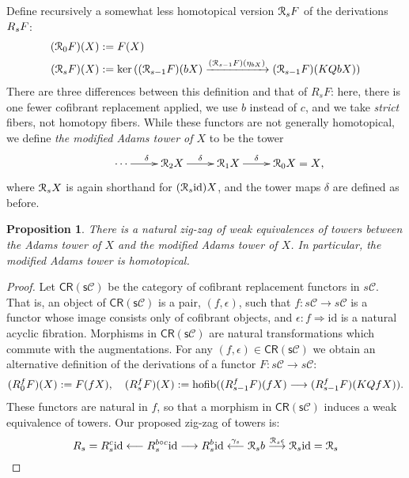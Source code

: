 \documentclass[11pt]{amsart} \renewcommand{\baselinestretch}{1.2}
\theoremstyle{plain}
\newtheorem{prop}[thm]{Proposition}
\theoremstyle{definition}
\renewcommand{\ker}{\mathrm{ker}\,}
\DeclareMathOperator*{\hofib}{hofib}
\renewcommand{\to}{\longrightarrow}
\newcommand{\from}{\longleftarrow}
\newcommand{\calR}{\mathcal{R}}
\newcommand{\calc}{\mathcal{C}}
\newcommand{\Id}{\mathrm{id}}
\newcommand{\algcat}{{\calc}}%
\newcommand{\dupdown}[2]{R_{\smash{#1}}}
\newcommand{\caldup}[1]{\calR_{\smash{#1}}}
\newcommand{\plainD}{R}
\newcommand{\barConstructionMightAbbreviate}{b}
\begin{document}
\begin{Bousfield-Kan spectral sequence}
Define recursively a somewhat less homotopical version $\caldup{s}F$ of the derivations $\dupdown{s}{}F$:
\begin{alignat*}{2}
(\caldup{0}F)(X)
&:=
F(X)%
\\
(\caldup{s}F)(X)
&:=
\ker((\caldup{s-1}F)(\barConstructionMightAbbreviate X)\xrightarrow{(\caldup{s-1}F)(\eta_{\barConstructionMightAbbreviate X})} (\caldup{s-1}F)(KQ\barConstructionMightAbbreviate X))
\end{alignat*}
There are three differences between this definition and that of $\plainD_sF$: here, there is one fewer cofibrant replacement applied, we use $\barConstructionMightAbbreviate $ instead of  $c$, and we take \emph{strict} fibers, not homotopy fibers.
While these functors are not generally homotopical, we define \emph{the modified Adams tower of $X$} to be the tower
\[\xymatrix@R=4mm{
\cdots 
\ar[r]^{\delta}
&%
\caldup{2}X
\ar[r]^{\delta}
&%
\caldup{1}X
\ar[r]^{\delta}&%
\caldup{0}X\makebox[0cm][l]{${}=X$,}
}\]
where $\caldup{s}X$ is again shorthand for $(\caldup{s}\Id )X$, and the tower maps $\delta$ are defined as before.
\begin{prop}
\label{prop:modifiedAdamsTower}
There is a natural zig-zag of weak equivalences of towers between the Adams tower of $X$ and the modified Adams tower of $X$. In particular, the modified Adams tower is homotopical.
\end{prop}
\begin{proof}
Let $\mathsf{CR(s\algcat)}$ be the category of cofibrant replacement functors in $s\algcat$. That is, an object of $\mathsf{CR(s\algcat)}$ is a pair, $(f,\epsilon)$, such that $f:s\algcat\to s\algcat$ is a functor whose image consists only of cofibrant objects, and $\epsilon:f\Rightarrow \Id $ is a natural acyclic fibration. Morphisms in $\mathsf{CR(s\algcat)}$ are natural transformations which commute with the augmentations. For any $(f,\epsilon)\in\mathsf{CR(s\algcat)}$ we obtain an alternative definition of the derivations of a functor $F:s\algcat\to s\algcat$:
\begin{alignat*}{2}
(\plainD_{\smash{0}}^{\smash{f}}F)(X)
:=
F(fX),\quad %
(\plainD_{\smash{s}}^{\smash{f}}F)(X)
:=
\hofib((\plainD_{\smash{s-1}}^{\smash{f}}F)(fX)\to (\plainD_{\smash{s-1}}^{\smash{f}}F)(KQfX)).
\end{alignat*}
These functors are natural in $f$, so that a morphism in $\mathsf{CR(s\algcat)}$ induces a weak equivalence of towers. Our proposed zig-zag of towers is: 
\[\plainD_{\smash{s}}= \plainD_{\smash{s}}^{\smash{c}}\Id \overset{}{\from}\plainD_{\smash{s}}^{\smash{\barConstructionMightAbbreviate \circ c}}\Id \overset{}{\to}\plainD_{\smash{s}}^{\smash{\barConstructionMightAbbreviate }}\Id \overset{\gamma_s}{\from}\caldup{s}\barConstructionMightAbbreviate \overset{\caldup{s}\epsilon}{\to}\caldup{s}\Id =\caldup{s}\]

\end{proof}
\end{Bousfield-Kan spectral sequence}
\end{document}
